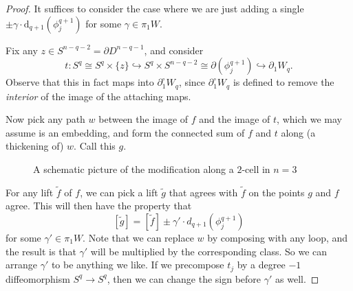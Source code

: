 \documentclass[a4paper, 12pt]{article}
\theoremstyle{definition}
\begin{document}
\begin{proof}\leavevmode
  It suffices to consider the case where we are just adding a single $\pm \gamma \cdot \mathrm{d}_{q + 1} (\phi^{q + 1}_j)$ for some $\gamma \in \pi_1 W$.

  Fix any $z \in S^{n - q - 2} = \partial D^{n - q - 1}$, and consider
  \[
    t : S^q \cong S^q \times \{z\} \hookrightarrow S^q \times S^{n - q - 2} \cong \partial (\phi_j^{q + 1}) \hookrightarrow \partial_1 W_q.
  \]
  Observe that this in fact maps into $\partial_1^\circ W_q$, since $\partial_1^\circ W_q$ is defined to remove the \emph{interior} of the image of the attaching maps.

  Now pick any path $w$ between the image of $f$ and the image of $t$, which we may assume is an embedding, and form the connected sum of $f$ and $t$ along (a thickening of) $w$. Call this $g$.
  \begin{figure}[H]
    \centering
    \caption{A schematic picture of the modification along a $2$-cell in $n = 3$}
  \end{figure}
  For any lift $\tilde{f}$ of $f$, we can pick a lift $\tilde{g}$ that agrees with $\tilde{f}$ on the points $g$ and $f$ agree. This will then have the property that
  \[
    [\tilde{g}] = [\tilde{f}] \pm \gamma' \cdot d_{q + 1}(\phi_j^{q + 1})
  \]
  for some $\gamma' \in \pi_1 W$. Note that we can replace $w$ by composing with any loop, and the result is that $\gamma'$ will be multiplied by the corresponding class. So we can arrange $\gamma'$ to be anything we like. If we precompose $t_j$ by a degree $-1$ diffeomorphism $S^q \to S^q$, then we can change the sign before $\gamma'$ as well.
\end{proof}
\end{document}

